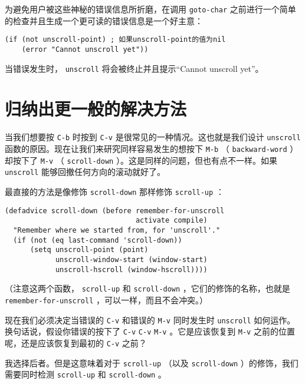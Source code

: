为避免用户被这些神秘的错误信息所折磨，在调用 \texttt{goto-char} 之前进行一个简单的检查并且生成一个更可读的错误信息是一个好主意：

\begin{verbatim}
(if (not unscroll-point) ; 如果unscroll-point的值为nil
    (error "Cannot unscroll yet"))
\end{verbatim}

当错误发生时， \texttt{unscroll} 将会被终止并且提示“Cannot unscroll yet”。

\section{归纳出更一般的解决方法}
\label{section:03-Generalizing-the-Solution}

当我们想要按 \verb|C-b| 时按到 \verb|C-v| 是很常见的一种情况。这也就是我们设计 \texttt{unscroll} 函数的原因。现在让我们来研究同样容易发生的想按下 \verb|M-b| （ \texttt{backward-word} ）却按下了 \verb|M-v| （ \texttt{scroll-down} ）。这是同样的问题，但也有点不一样。如果 \texttt{unscroll} 能够回撤任何方向的滚动就好了。

最直接的方法是像修饰 \texttt{scroll-down} 那样修饰 \texttt{scroll-up} ：

\begin{verbatim}
(defadvice scroll-down (before remember-for-unscroll
                               activate compile)
  "Remember where we started from, for 'unscroll'."
  (if (not (eq last-command 'scroll-down))
      (setq unscroll-point (point)
            unscroll-window-start (window-start)
            unscroll-hscroll (window-hscroll))))
\end{verbatim}

（注意这两个函数， \texttt{scroll-up} 和 \texttt{scroll-down} ，它们的修饰的名称，也就是 \texttt{remember-for-unscroll} ，可以一样，而且不会冲突。）

现在我们必须决定当错误的 \verb|C-v| 和错误的 \verb|M-v| 同时发生时 \texttt{unscroll} 如何运作。换句话说，假设你错误的按下了 \verb|C-v| \verb|C-v| \verb|M-v| 。它是应该恢复到 \verb|M-v| 之前的位置呢，还是应该恢复到最初的 \verb|C-v| 之前？

我选择后者。但是这意味着对于 \texttt{scroll-up} （以及 \texttt{scroll-down} ）的修饰，我们需要同时检测 \texttt{scroll-up} 和 \texttt{scroll-down} 。

